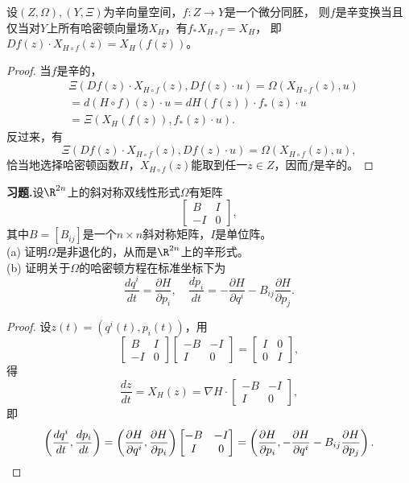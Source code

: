 \begin{proposition}
    设$(Z,\Omega),(Y,\Xi)$为辛向量空间，$f\colon Z\to Y$是一个微分同胚，
    则$f$是辛变换当且仅当对$Y$上所有哈密顿向量场$X_H$，有$f_*X_{H\circ f}=X_H$，
    即$Df(z)\cdot X_{H\circ f}(z)=X_H(f(z))$。
\end{proposition}
\begin{proof}
    当$f$是辛的，
    \begin{align*}
        &\Xi(Df(z)\cdot X_{H\circ f}(z),Df(z)\cdot u)
        =\Omega(X_{H\circ f}(z),u)\\
        &=d(H\circ f)(z)\cdot u=dH(f(z))\cdot f_*(z)\cdot u\\
        &=\Xi(X_H(f(z)),f_*(z)\cdot u).
    \end{align*}
    反过来，有
    $$\Xi(Df(z)\cdot X_{H\circ f}(z),Df(z)\cdot u)=\Omega(X_{H\circ f}(z),u),$$
    恰当地选择哈密顿函数$H$，$X_{H\circ f}(z)$能取到任一$z\in Z$，因而$f$是辛的。
\end{proof}

\textbf{习题.}设$\R^{2n}$上的斜对称双线性形式$\Omega$有矩阵
$$\begin{bmatrix}B&I\\-I&0\end{bmatrix},$$
其中$B=[B_{ij}]$是一个$n\times n$斜对称矩阵，$I$是单位阵。\\
(a) 证明$\Omega$是非退化的，从而是$\R^{2n}$上的辛形式。\\
(b) 证明关于$\Omega$的哈密顿方程在标准坐标下为
$$\frac{dq^i}{dt}=\frac{\partial H}{\partial p_i},\quad
\frac{dp_i}{dt}=-\frac{\partial H}{\partial q^i}-B_{ij}\frac{\partial H}{\partial p_j}.$$
\begin{proof}
    设$z(t)=(q^i(t),p_i(t))$，用
    $$\begin{bmatrix}B&I\\-I&0\end{bmatrix}\begin{bmatrix}-B&-I\\I&0\end{bmatrix}
    =\begin{bmatrix}I&0\\0&I\end{bmatrix},$$
    得
    $$\frac{dz}{dt}=X_H(z)=\nabla H\cdot\begin{bmatrix}-B&-I\\I&0\end{bmatrix},$$
    即
    $$\left(\frac{dq^i}{dt},\frac{dp_i}{dt}\right)
    =\left(\frac{\partial H}{\partial q^i},\frac{\partial H}{\partial p_i}\right)
    \begin{bmatrix}-B&-I\\I&0\end{bmatrix}
    =\left(\frac{\partial H}{\partial p_i},-\frac{\partial H}{\partial q^i}
    -B_{ij}\frac{\partial H}{\partial p_j}\right).\qedhere$$
\end{proof}

